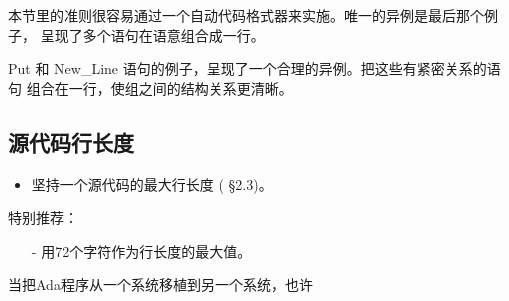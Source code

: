 \begin{blockindent}
本节里的准则很容易通过一个自动代码格式器来实施。唯一的异例是最后那个例子，
呈现了多个语句在语意组合成一行。
\end{blockindent}

\begin{blockindent}
Put 和 New\_Line 语句的例子，呈现了一个合理的异例。把这些有紧密关系的语句
组合在一行，使组之间的结构关系更清晰。
\end{blockindent}

\subsection{源代码行长度}
\begin{itemize}
    \item 坚持一个源代码的最大行长度 (\cite{nissen84} \S{}2.3)。
\end{itemize}

\begin{blockindent}
特别推荐：
\begin{itemize}
    \item[-] 用72个字符作为行长度的最大值。
\end{itemize}
\end{blockindent}

\begin{blockindent}
当把Ada程序从一个系统移植到另一个系统，也许
\end{blockindent}
